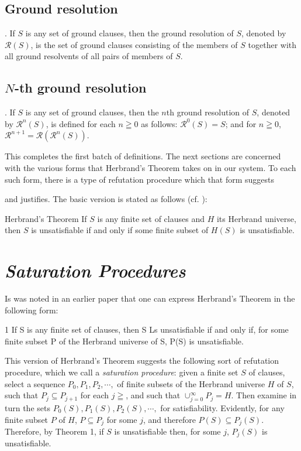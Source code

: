 \documentclass[8pt]{extarticle}
\begin{document}
\subsection{Ground resolution}. If $S$ is any set of ground clauses, then the ground resolution of $S$, denoted by $\mathscr{R}(S)$, is the set of ground clauses consisting of the members of $S$ together with all ground resolvents of all pairs of members of $S$.

\subsection{$N$-th ground resolution}. If $S$ is any set of ground clauses, then the $n$th ground resolution of $S$, denoted by $\mathscr{R}^n(S)$, is defined for each $n\geqq 0$ as follows: $\mathscr{R}^0(S) = S$; and for $n\geqq 0$, $\mathscr{R}^{n+1} = \mathscr{R}(\mathscr{R}^n(S))$.

This completes the first batch of definitions. The next sections are concerned with the various forms that Herbrand's Theorem takes on in our system. To each such form, there is a type of refutation procedure which that form suggests

\newpage

\noindent and justifies. The basic version is stated as follows (cf. \cite{davis_1960,gilmore_1960}):

\begin{p5herbrandt}{Herbrand's Theorem}\label{p5herbrandt}
If $S$ is any finite set of clauses and $H$ its Herbrand universe, then $S$ is unsatisfiable if and only if some finite subset of $H(S)$ is unsatisfiable.
\end{p5herbrandt}

\section{\emph{Saturation Procedures}}

Is was noted in an earlier paper \cite{robinson_1963} that one can express Herbrand's Theorem in the following form:

\begin{p5theorem}{1}\label{p5theorem}
If S is any finite set of clauses, then S Ls unsatisfiable if and only if, for some finite subset P of the Herbrand universe of S, P(S) is unsatisfiable. 
\end{p5theorem}

This version of Herbrand's Theorem suggests the following sort of refutation procedure, which we call a \emph{saturation procedure}: given a finite set $S$ of clauses, select a sequence $P_0, P_1, P_2, \dotsm ,$ of finite subsets of the Herbrand universe $H$ of $S$, such that $P_j \subseteq P_{j+1}$ for each $j\geqq$, and such that  $\cup_{j=0}^\infty P_j = H$. Then examine in turn the sets $P_0(S),P_1(S),P_2(S), \dotsm ,$ for satisfiability. Evidently, for any finite subset $P$ of $H$, $P \subseteq P_j$ for some $j$, and therefore $P(S) \subseteq P_j(S)$. Therefore, by Theorem 1, if $S$ is unsatisfiable then, for some $j$, $P_j(S)$ is unsatisfiable.
\end{document}
